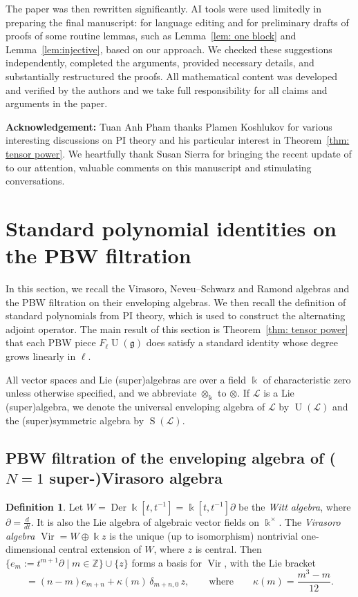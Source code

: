 \documentclass[12pt]{amsart}
\theoremstyle{plain}
\theoremstyle{definition}
\newtheorem{definition}[theorem]{Definition}
\numberwithin{equation}{theorem}
\newcommand{\kk}{\Bbbk}
\newcommand{\Vir}{\operatorname{Vir}}
\newcommand{\Sa}{\operatorname{S}}
\newcommand{\UU}{\operatorname{U}}
\newcommand{\ZZ}{\mathbb{Z}}
\newcommand{\del}{\partial}
\newcommand{\mc}[1]{\mathcal{#1}}
\newcommand{\Der}{\operatorname{Der}}
\newcommand{\g}{\mathfrak{g}}
\begin{document}
The paper was then rewritten significantly. AI tools were used limitedly in preparing the final manuscript: for language editing and for preliminary drafts of proofs of some routine lemmas, such as Lemma~\ref{lem: one block} and Lemma~\ref{lem:injective}, based on our approach. We checked these suggestions independently, completed the arguments, provided necessary details, and substantially restructured the proofs. All mathematical content was developed and verified by the authors and we take full responsibility for all claims and arguments in the paper.


\textbf{Acknowledgement: } Tuan Anh Pham thanks Plamen Koshlukov for various interesting discussions on PI theory and his particular interest in Theorem~\ref{thm: tensor power}. We heartfully thank Susan Sierra for bringing the recent update of \cite{FeiginKanelKhoroshkin} to our attention, valuable comments on this manuscript and stimulating conversations.


\section{Standard polynomial identities on the PBW  filtration}\label{sec: standard}

In this section, we recall the Virasoro, Neveu--Schwarz and Ramond algebras and the PBW filtration on their enveloping algebras. We then recall the definition of standard polynomials from PI theory, which is used to construct the alternating adjoint operator. The main result of this section is Theorem~\ref{thm: tensor power} that each PBW piece $F_\ell \UU(\g)$ does satisfy a standard identity whose degree grows linearly in $\ell$. 

All vector spaces and Lie (super)algebras are over a field $\kk$ of characteristic zero unless otherwise specified, and we abbreviate $\otimes_{\kk}$ to $\otimes$. If $\mc{L}$ is a Lie (super)algebra, we denote the universal enveloping algebra of $\mc{L}$ by $\UU(\mc{L})$ and the (super)symmetric algebra by $\Sa(\mc{L})$.

\subsection{PBW filtration of the enveloping algebra of \texorpdfstring{($N=1$ super-)}{super}Virasoro algebra}
\begin{definition}
Let $W = \Der \kk[t, t^{-1}] = \kk[t, t^{-1}]\partial$ be the \emph{Witt algebra}, where $\partial = \frac{d}{dt}$. It is also the Lie algebra of algebraic vector fields on $\kk^\times$. The \emph{Virasoro algebra} $\Vir = W \oplus \kk z$ is the unique (up to isomorphism) nontrivial one-dimensional central extension of $W$, where $z$ is central. Then $\{e_m := t^{m+1}\del \mid m \in \ZZ\} \cup \{z\}$ forms a basis for $\Vir$, with the Lie bracket 
\begin{equation}
    [e_m, e_n] = (n-m) e_{m+n} + \kappa(m) \, \delta_{m+n,0} \, z, \qquad \text{where} \qquad \kappa(m) = \frac{m^3-m}{12}.
\end{equation}
\end{definition}
\end{document}
